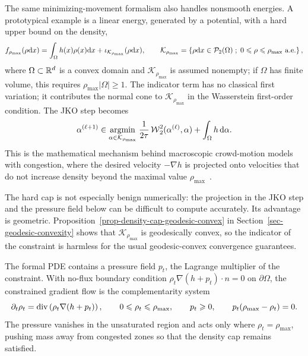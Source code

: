 The same minimizing-movement formalism also handles nonsmooth energies. A prototypical example is a linear energy, generated by a potential, with a hard upper bound on the density,
\begin{equation}\label{eq-density-constrained-energy}
	f_{\rho_{\max}}(\rho\d x)=\int_\Omega h(x)\rho(x)\d x+
	\iota_{\mathcal K_{\rho_{\max}}}(\rho\d x),
	\qquad
	\mathcal K_{\rho_{\max}}=
	\enscond{\rho\d x\in\Pp_2(\Omega)}{0\leq\rho\leq\rho_{\max}\ \text{a.e.}},
\end{equation}
where $\Omega\subset\mathbb{R}^d$ is a convex domain and $\mathcal K_{\rho_{\max}}$ is assumed nonempty; if $\Omega$ has finite volume, this requires $\rho_{\max}|\Omega|\geq1$. The indicator term has no classical first variation; it contributes the normal cone to $\mathcal K_{\rho_{\max}}$ in the Wasserstein first-order condition. The JKO step becomes
\begin{equation}\label{eq-density-constrained-jko}
	\alpha^{(\ell+1)}
	\in
	\underset{\alpha\in\mathcal K_{\rho_{\max}}}{\operatorname{argmin}}\;
	\frac{1}{2\tau}\operatorname{\mathcal{W}}_2^2(\alpha^{(\ell)},\alpha)+\int_\Omega h\,\mathrm{d}\alpha.
\end{equation}
This is the mathematical mechanism behind macroscopic crowd-motion models with congestion, where the desired velocity $-\nabla h$ is projected onto velocities that do not increase density beyond the maximal value $\rho_{\max}$~\cite{maury2010macroscopic,SantambrogioCrowdReview}.

The hard cap is not especially benign numerically: the projection in the JKO step and the pressure field below can be difficult to compute accurately. Its advantage is geometric. Proposition~\ref{prop-density-cap-geodesic-convex} in Section~\ref{sec-geodesic-convexity} shows that $\mathcal K_{\rho_{\max}}$ is geodesically convex, so the indicator of the constraint is harmless for the usual geodesic-convex convergence guarantees.

The formal PDE contains a pressure field $p_t$, the Lagrange multiplier of the constraint. With no-flux boundary condition $\rho_t\nabla(h+p_t)\cdot n=0$ on $\partial\Omega$, the constrained gradient flow is the complementarity system
\begin{equation}\label{eq-density-constrained-pressure-flow}
	\partial_t\rho_t=\operatorname{div}\left(\rho_t\nabla(h+p_t)\right),
	\qquad
	0\leqslant\rho_t\leqslant\rho_{\max},
	\qquad
	p_t\geqslant0,
	\qquad
	p_t(\rho_{\max}-\rho_t)=0.
\end{equation}
The pressure vanishes in the unsaturated region and acts only where $\rho_t=\rho_{\max}$, pushing mass away from congested zones so that the density cap remains satisfied.

